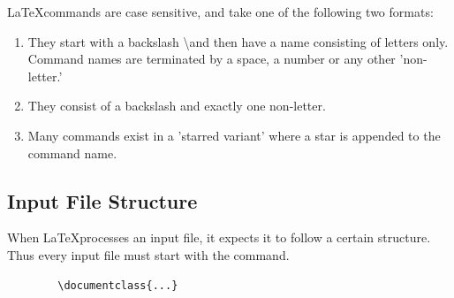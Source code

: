 \documentclass{article}
\begin{document}
	\LaTeX commands are case sensitive, and take one of the following two formats:
	\begin{enumerate}
		\item They start with a backslash \textbackslash and then have a name consisting of
		letters only. Command names are terminated by a space, a number or
		any other 'non-letter.'
		\item They consist of a backslash and exactly one non-letter.
		\item Many commands exist in a 'starred variant' where a star is appended
		to the command name.
	\end{enumerate}
\subsection{Input File Structure}
	When \LaTeX processes an input file, it expects it to follow a certain structure. Thus every input file must start with the command.
	\begin{verbatim}
		\documentclass{...}
	\end{verbatim}
\end{document}
